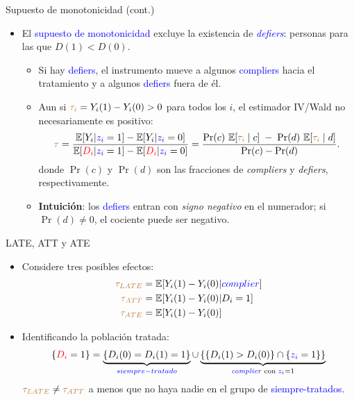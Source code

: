 \documentclass[10pt, xcolor=dvipsnames]{beamer}
\begin{document}
\begin{frame}{Supuesto de monotonicidad (cont.)}
\begin{itemize}\setlength{\itemsep}{1.0em}
    \item El \textcolor{blue}{supuesto de monotonicidad} excluye la existencia de \textit{\textcolor{blue}{defiers}}: personas para las que $D(1)<D(0)$. %
    \smallspace
    \begin{itemize}\setlength{\itemsep}{0.6em}
        \item Si hay \textcolor{blue}{defiers}, el instrumento mueve a algunos \textcolor{blue}{compliers} hacia el tratamiento y a algunos \textcolor{blue}{defiers} fuera de él. %
        \smallskip
            \item Aun si \(\textcolor{brown}{\tau_i}=Y_i(1)-Y_i(0)>0\) para todos los \(i\), el estimador IV/Wald no necesariamente es positivo:
        \[
        \textcolor{brown}{\tau} = \frac{\operatorname{\mathbb{E}}[Y_i|\textcolor{blue}{z_i} =1] - \operatorname{\mathbb{E}}[Y_i|\textcolor{blue}{z_i} =0]}{\operatorname{\mathbb{E}}[\textcolor{red}{D_i}|\textcolor{blue}{z_i} =1] - \operatorname{\mathbb{E}}[\textcolor{red}{D_i}|\textcolor{blue}{z_i} =0]} =
        \frac{\Pr(c)\,\operatorname{\mathbb{E}}[\textcolor{brown}{\tau_i}\mid c] \;-\; \Pr(d)\,\operatorname{\mathbb{E}}[\textcolor{brown}{\tau_i}\mid d]}{\Pr(c)-\Pr(d)}.
        \]
        donde \(\Pr(c)\) y \(\Pr(d)\) son las fracciones de \textit{compliers} y \textit{defiers}, respectivamente. %
        \smallskip
        \item \textbf{Intuición}: los \textcolor{blue}{defiers} entran con \emph{signo negativo} en el numerador; si \(\Pr(d) \neq 0\), el cociente puede ser negativo.
    \end{itemize}
\end{itemize}
\end{frame}


\begin{frame}{LATE, ATT y ATE}
\begin{itemize}
	\item Considere tres posibles efectos:
	\begin{equation*}
	\begin{split}
	\textcolor{brown}{\tau_{LATE}} &= \operatorname{\mathbb{E}}[Y_i(1) - Y_i(0)|\textcolor{blue}{complier}] \\ 
	\textcolor{brown}{\tau_{ATT}} &= \operatorname{\mathbb{E}}[Y_i(1) - Y_i(0)|D_i=1] \\
	\textcolor{brown}{\tau_{ATE}} &= \operatorname{\mathbb{E}}[Y_i(1) - Y_i(0)] \\ 
	\end{split}
	\end{equation*}	
	\item Identificando la población tratada:
	\begin{align*}
	\{\textcolor{red}{D_i}=1\} = \underbrace{\{D_i(0)=D_i(1)=1\}}_{\textcolor{blue}{siempre-tratado}} \cup \underbrace{\{\{D_i(1)>D_i(0)\}\cap \{\textcolor{blue}{z_i} =1\}\}}_{\text{\textcolor{blue}{\textit{complier}} con} \; \textcolor{blue}{z_i} =1} 
	\end{align*}
	$\textcolor{brown}{\tau_{LATE}}\neq\textcolor{brown}{\tau_{ATT}}$ a menos que no haya nadie en el grupo de \textcolor{blue}{siempre-tratados}. 
\end{itemize}	
\end{frame}
\end{document}
